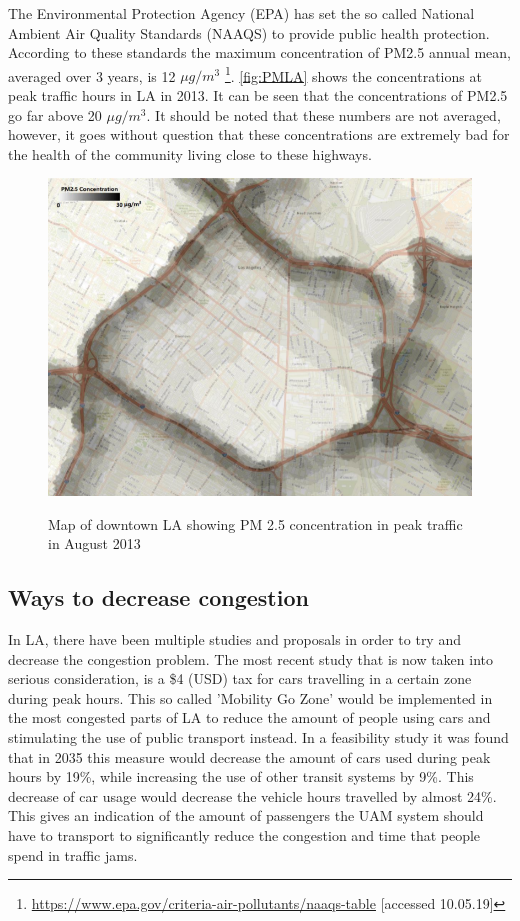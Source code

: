 The Environmental Protection Agency (EPA) has set the so called National Ambient Air Quality Standards (NAAQS) to provide public health protection. According to these standards the maximum concentration of PM2.5 annual mean, averaged over 3 years,
is 12 $\mu g / m^3$ \footnote{\url{https://www.epa.gov/criteria-air-pollutants/naaqs-table} [accessed 10.05.19]}. \autoref{fig:PMLA} shows the concentrations at peak traffic hours in LA in 2013. It can be seen that the concentrations of PM2.5 go far above 20 $\mu g / m^3$. It should be noted that these numbers are not averaged, however, it goes without question that these concentrations are extremely bad for the health of the community living close to these highways.  

\begin{figure}[h]
    \centering
    \includegraphics[width=0.75\linewidth]{Figures/PMLA.png}
    \captionsetup{justification=centering}
    \caption{Map of downtown LA showing PM 2.5 concentration in peak traffic in August 2013} \cite{pmlevelLA}
    \label{fig:PMLA}
\end{figure}

\subsection{Ways to decrease congestion}
In LA, there have been multiple studies and proposals in order to try and decrease the congestion problem. The most recent study that is now taken into serious consideration, is a \$4 (USD) tax for cars travelling in a certain zone during peak hours. This so called 'Mobility Go Zone' \cite{mobilitygo} would be implemented in the most congested parts of LA to reduce the amount of people using cars and stimulating the use of public transport instead. In a feasibility study it was found that in 2035 this measure would decrease the amount of cars used during peak hours by 19\%, while increasing the use of other transit systems by 9\%. This decrease of car usage would decrease the vehicle hours travelled by almost 24\%. This gives an indication of the amount of passengers the UAM system should have to transport to significantly reduce the congestion and time that people spend in traffic jams. 

